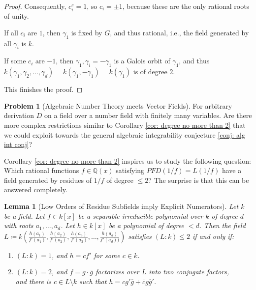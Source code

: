 \documentclass{amsart}
\newtheorem{lemma}[thm]{Lemma}
\theoremstyle{definition}
\newtheorem{problem}[thm]{Problem}
\begin{document}
\begin{proof}
    Consequently, $c_i^e=1$, so $c_i=\pm 1$, because these are the only rational roots of unity. 
    
    If all $c_i$ are $1$, then $\gamma_1$ is fixed by $G$, and thus rational, i.e., the field generated by all $\gamma_i$ is $k$.

    If some $c_i$ are $-1$, then $\gamma_1,\gamma_i=-\gamma_1$ is a Galois orbit of $\gamma_1$, and thus $k(\gamma_1,\gamma_2,\ldots,\gamma_d)=k(\gamma_1,-\gamma_1)=k(\gamma_1)$ is of degree $2$.

    This finishes the proof.
\end{proof}

\begin{problem}[Algebraic Number Theory meets Vector Fields]
    For arbitrary derivation $D$ on a field over a number field with finitely many variables. Are there more complex restrictions similar to Corollary \ref{cor: degree no more than 2} that we could exploit towards the general algebraic integrability conjecture \ref{conj: alg int conj}?
\end{problem}


    Corollary \ref{cor: degree no more than 2} inspires us to study the following question:
    Which rational functions $f\in\mathbb{Q}(x)$ satisfying $PFD(1/f)=L(1/f)$
    have a field generated by residues of $1/f$ of degree $\le 2$?
    The surprise is that this can be answered completely.


\begin{lemma}[Low Orders of Residue Subfields imply Explicit Numerators]\label{lem: explicit h for residues field of orders 1,2}
    Let $k$ be a field. Let $f\in k[x]$ be a separable irreducible polynomial over $k$ of degree $d$ with roots $a_1,\ldots,a_d$.  Let $h\in k[x]$ be a polynomial of degree $<d$.
    Then the field $L\coloneqq k\left(\frac{h(a_1)}{f'(a_1)},\frac{h(a_2)}{f'(a_2)} ,\frac{h(a_3)}{f'(a_3)}, \ldots, \frac{h(a_d)}{f'(a_d))}\right)$
    satisfies $(L:k) \le 2$ if and only if:
    \begin{enumerate}
        \item $(L:k) =1$, and $h=cf'$ for some $c\in k$.
        \item $(L:k) = 2$, and $f=g\cdot \overline{g}$ factorizes over $L$ into two conjugate factors, 
        \\and there is $c\in L\setminus k$ such that $h=cg' \overline{g}+ \overline{c}g\overline{g}'$.
    \end{enumerate}
\end{lemma}
\end{document}
